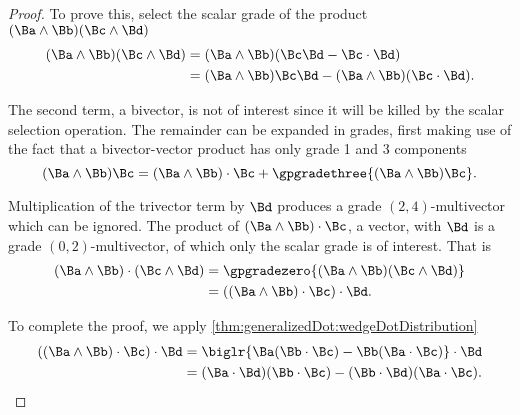 \begin{proof}
To prove this, select the scalar grade of the product \( (\Ba \wedge \Bb) (\Bc \wedge \Bd) \)
\begin{equation}\label{eqn:generalizedDot_bivectorDot:1160}
\begin{aligned}
(\Ba \wedge \Bb) (\Bc \wedge \Bd)
&= (\Ba \wedge \Bb) (\Bc \Bd - \Bc \cdot \Bd) \\
&= (\Ba \wedge \Bb) \Bc \Bd - (\Ba \wedge \Bb) (\Bc \cdot \Bd).
\end{aligned}
\end{equation}

The second term, a bivector, is not of interest since it will be killed by the scalar selection operation.
The remainder can be expanded in grades, first making use of the fact that a bivector-vector product has only
grade 1 and 3 components
\begin{equation}\label{eqn:generalizedDot_bivectorDot:1180}
(\Ba \wedge \Bb) \Bc
=
(\Ba \wedge \Bb) \cdot \Bc
+ \gpgradethree{ (\Ba \wedge \Bb) \Bc }.
\end{equation}

Multiplication of the trivector term by \( \Bd \) produces a grade \((2,4)\)-multivector which can be ignored.
The product
of \( (\Ba \wedge \Bb) \cdot \Bc \), a vector, with \( \Bd \) is a grade \((0,2)\)-multivector, of which only the scalar grade is of interest.
That is
\begin{equation}\label{eqn:generalizedDot_bivectorDot:1220}
\begin{aligned}
(\Ba \wedge \Bb) \cdot (\Bc \wedge \Bd)
&= \gpgradezero{ (\Ba \wedge \Bb) (\Bc \wedge \Bd) } \\
&= ((\Ba \wedge \Bb) \cdot \Bc )\cdot \Bd.
\end{aligned}
\end{equation}

To complete the proof, we apply \cref{thm:generalizedDot:wedgeDotDistribution}
\begin{equation}\label{eqn:generalizedDot_bivectorDot:1240}
\begin{aligned}
((\Ba \wedge \Bb) \cdot \Bc )\cdot \Bd
&= \biglr{ \Ba (\Bb \cdot \Bc) - \Bb (\Ba \cdot \Bc) } \cdot \Bd \\
&= (\Ba \cdot \Bd) (\Bb \cdot \Bc) - (\Bb \cdot \Bd) (\Ba \cdot \Bc).
\end{aligned}
\end{equation}
\end{proof}

